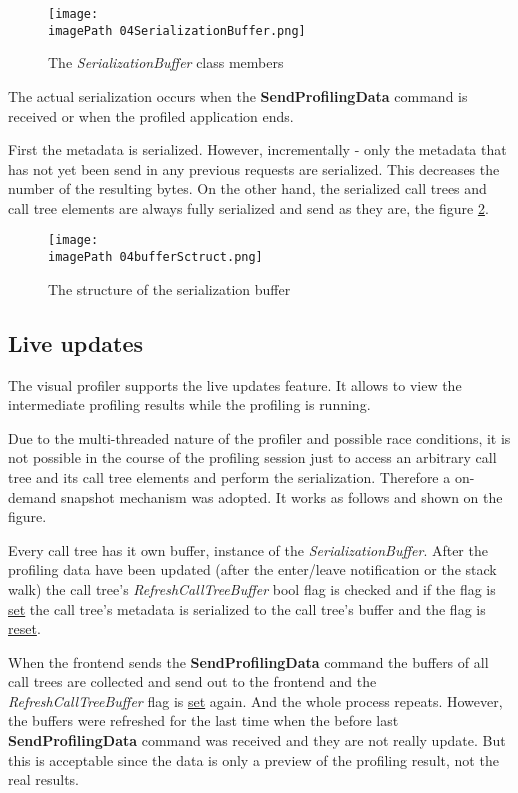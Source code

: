 \begin{figure}
	\centering
		\texttt{[image: \\imagePath 04SerializationBuffer.png]}
		\caption{The \textit{SerializationBuffer} class members}
	\label{fig:04SerializationBuffer}
\end{figure}

The actual serialization occurs when the \textbf{SendProfilingData} command is received or when the profiled application ends. 

First the metadata is serialized. However, incrementally - only the metadata that has not yet been send in any previous requests are serialized. This decreases the number of the resulting bytes. On the other hand, the serialized call trees and call tree elements are always fully serialized and send as they are, the figure \ref{fig:04bufferSctruct}.

\begin{figure}
	\centering
		\texttt{[image: \\imagePath 04bufferSctruct.png]}
		\caption{The structure of the serialization buffer }
	\label{fig:04bufferSctruct}
\end{figure}

\subsection{Live updates}
The visual profiler supports the live updates feature. It allows to view the intermediate profiling results while the profiling is running. 

Due to the multi-threaded nature of the profiler and possible race conditions, it is not possible in the course of the profiling session just to access an arbitrary call tree and its call tree elements and perform the serialization. Therefore a on-demand snapshot mechanism was adopted. It works as follows and shown on the figure. 

Every call tree has it own buffer, instance of the \textit{SerializationBuffer}. After the profiling data have been updated (after the enter/leave notification or the stack walk) the call tree's \textit{RefreshCallTreeBuffer} bool flag is checked and if the flag is \underline{set} the call tree's metadata is serialized to the call tree's buffer and the flag is \underline{reset}. 

When the frontend sends the \textbf{SendProfilingData} command the buffers of all call trees are collected and send out to the frontend and the \textit{RefreshCallTreeBuffer} flag is \underline{set} again. And the whole process repeats. However, the buffers were refreshed for the last time when the before last \textbf{SendProfilingData} command was received and they are not really update. But this is acceptable since the data is only a preview of the profiling result, not the real results.

